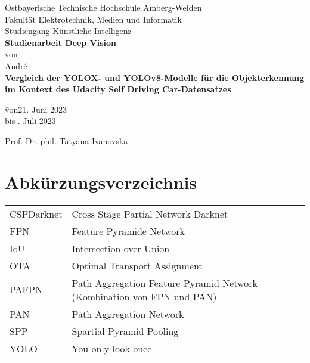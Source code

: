 \documentclass[12pt,oneside]{report}
\newcommand*{\Sperren}[1]{\textls*[100]{#1}}
\newcommand*{\IhrVorname}{André}
\newcommand*{\IhrNachname}{Kestler}
\newcommand*{\IhrStudiengang}{Künstliche Intelligenz}
\newcommand*{\IhreArbeit}{Studienarbeit Deep Vision}
\newcommand*{\IhrTitelDE}{Vergleich der YOLOX- und YOLOv8-Modelle für die Objekterkennung im Kontext des Udacity Self Driving Car-Datensatzes}
\newcommand*{\IhrBearbeitungszeitraumVON}{21. Juni 2023}
\newcommand*{\IhrBearbeitungszeitraumBIS}{19. Juli 2023}
\newcommand*{\IhrErstpruefer}{Prof. Dr. phil. Tatyana Ivanovska}
\begin{document}
  \thispagestyle{empty}
  \begin{center}
    \Large
    Ostbayerische Technische Hochschule Amberg-Weiden\\
    Fakultät Elektrotechnik, Medien und Informatik\\[1cm]
    Studiengang \IhrStudiengang\\[1cm]
    \textbf{\IhreArbeit}\\[1cm]
    von\\[1cm]
    \IhrVorname\ \Sperren{\textbf{\IhrNachname}}\\[1cm]
    \textbf{\IhrTitelDE}\\[1cm]
  \end{center}
  \vspace*{2.5cm}
  \begin{tabbing}
    \qquad\= von\qquad\=\IhrBearbeitungszeitraumVON\\
                                          \> bis      \>\IhrBearbeitungszeitraumBIS
  \end{tabbing}
  \vspace*{1cm}
  \qquad\IhrErstpruefer\par 
    \tableofcontents
    \thispagestyle{empty}
 	\newpage
  
  
  
  \chapter*{Abkürzungsverzeichnis}
    \begin{tabular}{ll}
    	CSPDarknet & Cross Stage Partial Network Darknet\\
    	FPN & Feature Pyramide Network\\
    	IoU & Intersection over Union\\
    	OTA & Optimal Transport Assignment\\
    	PAFPN & Path Aggregation Feature Pyramid Network (Kombination von FPN und PAN)\\
    	PAN & Path Aggregation Network\\
    	SPP & Spartial Pyramid Pooling\\
    	YOLO & You only look once\\
  	\end{tabular}
\end{document}
